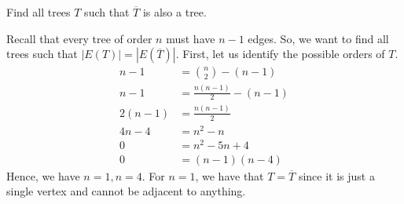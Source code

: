 \question
  Find all trees \(T\) such that \(\overline{T}\) is also a tree.

  \begin{solution}
    Recall that every tree of order \(n\) must have \(n-1\) edges. So, we want
    to find all trees such that \(|E(T)| = |E(\overline{T})|\). First, let us
    identify the possible orders of \(T\).
    \[
      \begin{aligned}
        n-1 &= \binom{n}{2} - (n-1) \\ 
        n-1 &= \frac{n(n-1)}{2} - (n-1) \\ 
        2(n-1) &= \frac{n(n-1)}{2} \\ 
        4n-4 &= n^2 - n \\ 
        0 &= n^2 - 5n + 4 \\ 
        0 &= (n-1)(n-4)
      \end{aligned}
    \]
    Hence, we have \(n=1, n=4\). For \(n=1\), we have that \(T=\overline{T}\)
    since it is just a single vertex and cannot be adjacent to anything.


\end{solution}
